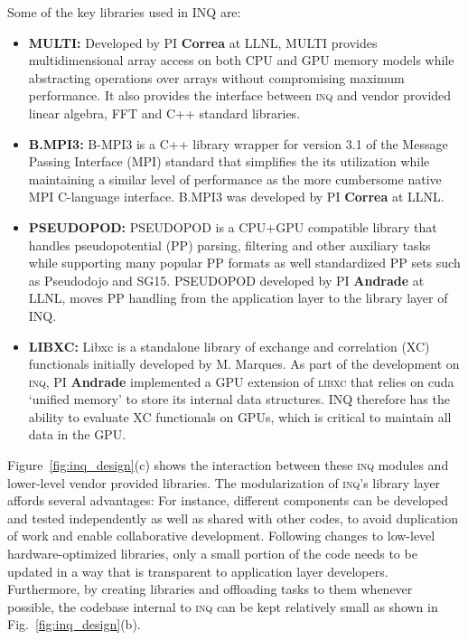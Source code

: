 Some of the key libraries used in INQ are:
\begin{itemize}
	\item \textbf{MULTI:} Developed by PI \textbf{Correa} at LLNL, \textsc{MULTI} provides multidimensional array access on both CPU and GPU memory models while abstracting operations over arrays without compromising maximum performance. 
	It also provides the interface between \textsc{inq} and vendor provided linear algebra, FFT and C++ standard libraries.
	\item \textbf{B.MPI3:} B-MPI3 is a C++ library wrapper for version 3.1 of the Message Passing Interface (MPI) standard that simplifies the its utilization while maintaining a similar level of performance as the more cumbersome native MPI C-language interface. 
	B.MPI3 was developed by PI \textbf{Correa} at LLNL.
	\item \textbf{PSEUDOPOD:} \textsc{PSEUDOPOD} is a CPU+GPU compatible library that handles pseudopotential (PP) parsing, filtering and other auxiliary tasks while supporting many popular PP formats as well standardized PP sets such as Pseudodojo and SG15. 
	\textsc{PSEUDOPOD} developed by PI \textbf{Andrade} at LLNL, moves PP handling from the application layer to the library layer of INQ.
	\item \textbf{LIBXC:} Libxc is a standalone library of exchange and correlation (XC) functionals initially developed by M. Marques. 
	As part of the development on \textsc{inq}, PI \textbf{Andrade} implemented a GPU extension of \textsc{libxc} that relies on cuda ‘unified memory’ to store its internal data structures. 
	\textsc{INQ} therefore has the ability to evaluate XC functionals on GPUs, which is critical to maintain all data in the GPU.
\end{itemize}

Figure~\ref{fig:inq_design}(c) shows the interaction between these \textsc{inq} modules and lower-level vendor provided libraries. 
The modularization of \textsc{inq}'s library layer affords several advantages: For instance, different components can be developed and tested independently as well as shared with other codes, to avoid duplication of work and enable collaborative development. 
Following changes to low-level hardware-optimized libraries, only a small portion of the code needs to be updated in a way that is transparent to application layer developers. 
Furthermore, by creating libraries and offloading tasks to them whenever possible, the codebase internal to \textsc{inq} can be kept relatively small as shown in Fig.~\ref{fig:inq_design}(b). 

